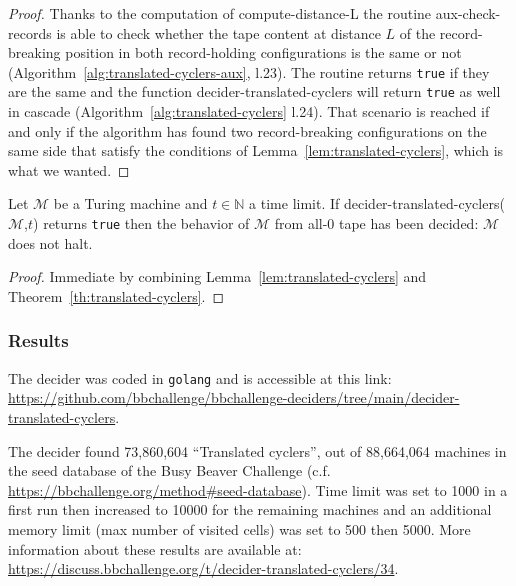 \begin{proof}
  Thanks to the computation of {\sc compute-distance-L} the routine {\sc aux-check-records} is able to check whether the tape content at distance $L$ of the record-breaking position in both record-holding configurations is the same or not (Algorithm~\ref{alg:translated-cyclers-aux}, l.23). The routine returns \texttt{true} if they are the same and the function {\sc decider-translated-cyclers} will return \texttt{true} as well in cascade (Algorithm~\ref{alg:translated-cyclers} l.24). That scenario is reached if and only if the algorithm has found two record-breaking configurations on the same side that satisfy the conditions of Lemma~\ref{lem:translated-cyclers}, which is what we wanted.
\end{proof}

\begin{corollary}
  Let $\mathcal{M}$ be a Turing machine and $t \in \mathbb{N}$ a time limit. If {\sc decider-translated-cyclers}($\mathcal{M}$,$t$) returns \texttt{true} then the behavior of $\mathcal{M}$ from all-0 tape has been decided: $\mathcal{M}$ does not halt.
\end{corollary}
\begin{proof}
  Immediate by combining Lemma~\ref{lem:translated-cyclers} and Theorem~\ref{th:translated-cyclers}.
\end{proof}

\subsubsection{Results}

The decider was coded in \texttt{golang} and is accessible at this link: \url{https://github.com/bbchallenge/bbchallenge-deciders/tree/main/decider-translated-cyclers}.

The decider found 73,860,604 ``Translated cyclers'', out of 88,664,064 machines in the seed database of the Busy Beaver Challenge (c.f. \url{https://bbchallenge.org/method#seed-database}). Time limit was set to 1000 in a first run then increased to 10000 for the remaining machines and an additional memory limit (max number of visited cells) was set to 500 then 5000. More information about these results are available at: \url{https://discuss.bbchallenge.org/t/decider-translated-cyclers/34}.
